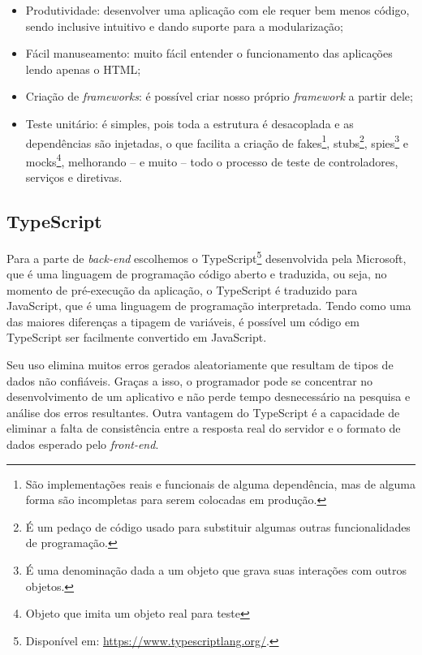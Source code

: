 \begin{itemize}
    \item Produtividade: desenvolver uma aplicação com ele requer bem menos código, sendo inclusive intuitivo e dando suporte para a modularização; 
    \item Fácil manuseamento: muito fácil entender o funcionamento das aplicações lendo apenas o HTML;   
    \item Criação de \textit{frameworks}: é possível criar nosso próprio \textit{framework} a partir dele;   
    \item Teste unitário: é simples, pois toda a estrutura é desacoplada e as dependências são injetadas, o que facilita a criação de fakes\footnote{ São implementações reais e funcionais de alguma dependência, mas de alguma forma são incompletas para serem colocadas em produção.}, stubs\footnote{É um pedaço de código usado para substituir algumas outras funcionalidades de programação.}, spies\footnote{É uma denominação dada a um objeto que grava suas interações com outros objetos.} e mocks\footnote{Objeto que imita um objeto real para teste}, melhorando -- e muito -- todo o processo de teste de controladores, serviços e diretivas. 
\end{itemize}

\subsection{TypeScript}
\label{ssec:TypeScript}
Para a parte de \textit{back-end} escolhemos o TypeScript\footnote{Disponível em: \url{https://www.typescriptlang.org/}.} desenvolvida pela Microsoft, que é uma linguagem de programação código aberto e traduzida, ou seja, no momento de pré-execução da aplicação, o TypeScript é traduzido para JavaScript, que é uma linguagem de programação interpretada. Tendo como uma das maiores diferenças a tipagem de variáveis, é possível um código em TypeScript ser facilmente convertido em JavaScript. 

Seu uso elimina muitos erros gerados aleatoriamente que resultam de tipos de dados não confiáveis. Graças a isso, o programador pode se concentrar no desenvolvimento de um aplicativo e não perde tempo desnecessário na pesquisa e análise dos erros resultantes. Outra vantagem do TypeScript é a capacidade de eliminar a falta de consistência entre a resposta real do servidor e o formato de dados esperado pelo \textit{front-end}.\cite{Jakub2019TypeScript}

